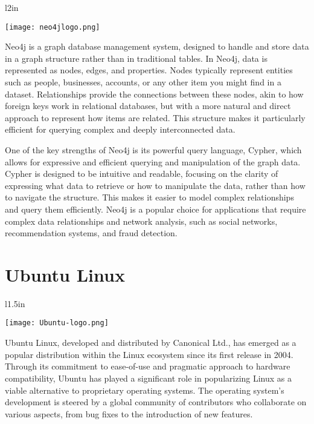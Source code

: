 \begin{wrapfigure}{l}{2in}
\begin{center}
\texttt{[image: neo4jlogo.png]}
\end{center}
\end{wrapfigure}

Neo4j is a graph database management system, designed to handle and store data in a graph structure rather than in traditional tables. In Neo4j, data is represented as nodes, edges, and properties. Nodes typically represent entities such as people, businesses, accounts, or any other item you might find in a dataset. Relationships provide the connections between these nodes, akin to how foreign keys work in relational databases, but with a more natural and direct approach to represent how items are related. This structure makes it particularly efficient for querying complex and deeply interconnected data.

One of the key strengths of Neo4j is its powerful query language, Cypher, which allows for expressive and efficient querying and manipulation of the graph data. Cypher is designed to be intuitive and readable, focusing on the clarity of expressing what data to retrieve or how to manipulate the data, rather than how to navigate the structure. This makes it easier to model complex relationships and query them efficiently. Neo4j is a popular choice for applications that require complex data relationships and network analysis, such as social networks, recommendation systems, and fraud detection.

\section{Ubuntu Linux}

\begin{wrapfigure}{l}{1.5in}
\begin{center}
\texttt{[image: Ubuntu-logo.png]}
\end{center}
\end{wrapfigure}

Ubuntu Linux, developed and distributed by Canonical Ltd., has emerged as a popular distribution within the Linux ecosystem since its first release in 2004. Through its commitment to ease-of-use and pragmatic approach to hardware compatibility, Ubuntu has played a significant role in popularizing Linux as a viable alternative to proprietary operating systems. The operating system's development is steered by a global community of contributors who collaborate on various aspects, from bug fixes to the introduction of new features.

